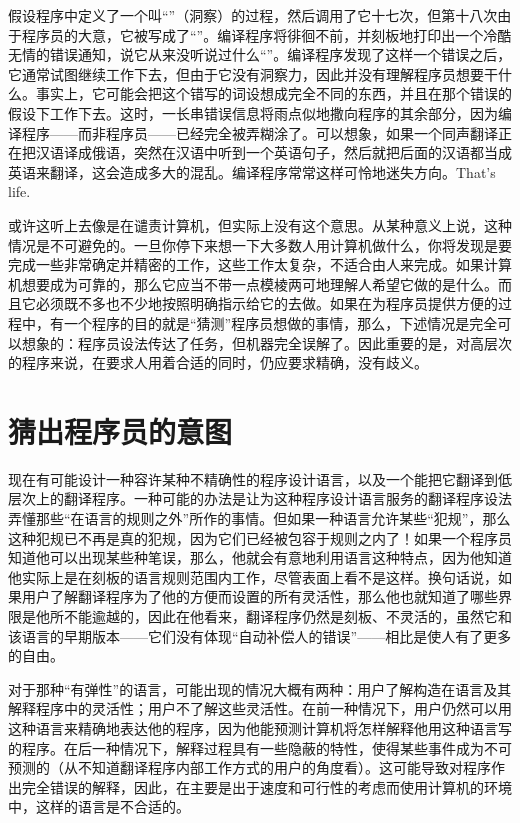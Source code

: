 假设程序中定义了一个叫“”（洞察）的过程，然后调用了它十七次，但第十八次由于程序员的大意，它被写成了“”。编译程序将徘徊不前，并刻板地打印出一个冷酷无情的错误通知，说它从来没听说过什么“”。编译程序发现了这样一个错误之后，它通常试图继续工作下去，但由于它没有洞察力，因此并没有理解程序员想要干什么。事实上，它可能会把这个错写的词设想成完全不同的东西，并且在那个错误的假设下工作下去。这时，一长串错误信息将雨点似地撒向程序的其余部分，因为编译程序——而非程序员——已经完全被弄糊涂了。可以想象，如果一个同声翻译正在把汉语译成俄语，突然在汉语中听到一个英语句子，然后就把后面的汉语都当成英语来翻译，这会造成多大的混乱。编译程序常常这样可怜地迷失方向。That's life.

或许这听上去像是在谴责计算机，但实际上没有这个意思。从某种意义上说，这种情况是不可避免的。一旦你停下来想一下大多数人用计算机做什么，你将发现是要完成一些非常确定并精密的工作，这些工作太复杂，不适合由人来完成。如果计算机想要成为可靠的，那么它应当不带一点模棱两可地理解人希望它做的是什么。而且它必须既不多也不少地按照明确指示给它的去做。如果在为程序员提供方便的过程中，有一个程序的目的就是“猜测”程序员想做的事情，那么，下述情况是完全可以想象的：程序员设法传达了任务，但机器完全误解了。因此重要的是，对高层次的程序来说，在要求人用着合适的同时，仍应要求精确，没有歧义。

\section{猜出程序员的意图}

现在有可能设计一种容许某种不精确性的程序设计语言，以及一个能把它翻译到低层次上的翻译程序。一种可能的办法是让为这种程序设计语言服务的翻译程序设法弄懂那些“在语言的规则之外”所作的事情。但如果一种语言允许某些“犯规”，那么这种犯规已不再是真的犯规，因为它们已经被包容于规则之内了！如果一个程序员知道他可以出现某些种笔误，那么，他就会有意地利用语言这种特点，因为他知道他实际上是在刻板的语言规则范围内工作，尽管表面上看不是这样。换句话说，如果用户了解翻译程序为了他的方便而设置的所有灵活性，那么他也就知道了哪些界限是他所不能逾越的，因此在他看来，翻译程序仍然是刻板、不灵活的，虽然它和该语言的早期版本——它们没有体现“自动补偿人的错误”——相比是使人有了更多的自由。

对于那种“有弹性”的语言，可能出现的情况大概有两种：用户了解构造在语言及其解释程序中的灵活性；用户不了解这些灵活性。在前一种情况下，用户仍然可以用这种语言来精确地表达他的程序，因为他能预测计算机将怎样解释他用这种语言写的程序。在后一种情况下，解释过程具有一些隐蔽的特性，使得某些事件成为不可预测的（从不知道翻译程序内部工作方式的用户的角度看）。这可能导致对程序作出完全错误的解释，因此，在主要是出于速度和可行性的考虑而使用计算机的环境中，这样的语言是不合适的。

